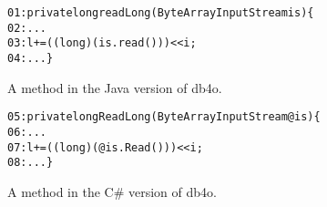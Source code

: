 \begin{figure}[t]
\begin{CodeOut}%
\begin{alltt}
01: private long readLong(ByteArrayInputStream is)\{
02:  ...
03:  l += ((long) (is.read())) << i;
04: ...\}
\end{alltt}
\end{CodeOut}\vspace*{-4ex}
\caption{A method in the Java version of db4o.}\vspace*{-2ex}
\label{fig:db4ojava}
\begin{CodeOut}%
\begin{alltt}
05: private long ReadLong(ByteArrayInputStream @is)\{
06:  ...
07:  l += ((long)(@is.Read())) << i;
08:  ...\}
\end{alltt}
\end{CodeOut}\vspace*{-4ex}
\caption{A method in the C\# version of db4o.}\vspace*{-5ex}
\label{fig:db40net}
\end{figure}

